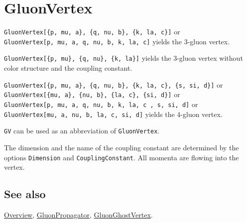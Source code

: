 \documentclass[../FeynCalcManual.tex]{subfiles}
\begin{document}
\hypertarget{gluonvertex}{%
\section{GluonVertex}\label{gluonvertex}}

\texttt{GluonVertex[\allowbreak{}\{\allowbreak{}p,\ \allowbreak{}mu,\ \allowbreak{}a\},\ \allowbreak{}\{\allowbreak{}q,\ \allowbreak{}nu,\ \allowbreak{}b\},\ \allowbreak{}\{\allowbreak{}k,\ \allowbreak{}la,\ \allowbreak{}c\}]}
or
\texttt{GluonVertex[\allowbreak{}p,\ \allowbreak{}mu,\ \allowbreak{}a,\ \allowbreak{}q,\ \allowbreak{}nu,\ \allowbreak{}b,\ \allowbreak{}k,\ \allowbreak{}la,\ \allowbreak{}c]}
yields the 3-gluon vertex.

\texttt{GluonVertex[\allowbreak{}\{\allowbreak{}p,\ \allowbreak{}mu\},\ \allowbreak{}\{\allowbreak{}q,\ \allowbreak{}nu\},\ \allowbreak{}\{\allowbreak{}k,\ \allowbreak{}la\}]}
yields the 3-gluon vertex without color structure and the coupling
constant.

\texttt{GluonVertex[\allowbreak{}\{\allowbreak{}p,\ \allowbreak{}mu,\ \allowbreak{}a\},\ \allowbreak{}\{\allowbreak{}q,\ \allowbreak{}nu,\ \allowbreak{}b\},\ \allowbreak{}\{\allowbreak{}k,\ \allowbreak{}la,\ \allowbreak{}c\},\ \allowbreak{}\{\allowbreak{}s,\ \allowbreak{}si,\ \allowbreak{}d\}]}
or
\texttt{GluonVertex[\allowbreak{}\{\allowbreak{}mu,\ \allowbreak{}a\},\ \allowbreak{}\{\allowbreak{}nu,\ \allowbreak{}b\},\ \allowbreak{}\{\allowbreak{}la,\ \allowbreak{}c\},\ \allowbreak{}\{\allowbreak{}si,\ \allowbreak{}d\}]}
or
\texttt{GluonVertex[\allowbreak{}p,\ \allowbreak{}mu,\ \allowbreak{}a,\ \allowbreak{}q,\ \allowbreak{}nu,\ \allowbreak{}b,\ \allowbreak{}k,\ \allowbreak{}la,\ \allowbreak{}c ,\ \allowbreak{}s,\ \allowbreak{}si,\ \allowbreak{}d]}
or
\texttt{GluonVertex[\allowbreak{}mu,\ \allowbreak{}a,\ \allowbreak{}nu,\ \allowbreak{}b,\ \allowbreak{}la,\ \allowbreak{}c,\ \allowbreak{}si,\ \allowbreak{}d]}
yields the 4-gluon vertex.

\texttt{GV} can be used as an abbreviation of \texttt{GluonVertex}.

The dimension and the name of the coupling constant are determined by
the options \texttt{Dimension} and \texttt{CouplingConstant}. All
momenta are flowing into the vertex.

\subsection{See also}

\hyperlink{toc}{Overview}, \hyperlink{gluonpropagator}{GluonPropagator},
\hyperlink{gluonghostvertex}{GluonGhostVertex}.
\end{document}
